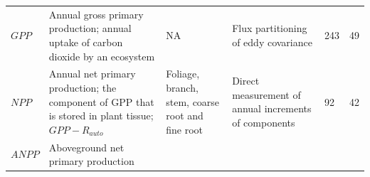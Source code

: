 \documentclass[]{article}
\begin{document}
\begin{longtable}[]{@{}llllll@{}}
\begin{minipage}[t]{0.14\columnwidth}
\(GPP\)\strut
\end{minipage} & \begin{minipage}[t]{0.19\columnwidth}\raggedright\strut
Annual gross primary production; annual uptake of carbon dioxide by an
ecosystem\strut
\end{minipage} & \begin{minipage}[t]{0.13\columnwidth}\raggedright\strut
NA\strut
\end{minipage} & \begin{minipage}[t]{0.23\columnwidth}\raggedright\strut
Flux partitioning of eddy covariance\strut
\end{minipage} & \begin{minipage}[t]{0.07\columnwidth}\raggedright\strut
243\strut
\end{minipage} & \begin{minipage}[t]{0.07\columnwidth}\raggedright\strut
49\strut
\end{minipage}\tabularnewline
\begin{minipage}[t]{0.14\columnwidth}\raggedright\strut
\(NPP\)\strut
\end{minipage} & \begin{minipage}[t]{0.19\columnwidth}\raggedright\strut
Annual net primary production; the component of GPP that is stored in
plant tissue; \(GPP - R_{auto}\)\strut
\end{minipage} & \begin{minipage}[t]{0.13\columnwidth}\raggedright\strut
Foliage, branch, stem, coarse root and fine root\strut
\end{minipage} & \begin{minipage}[t]{0.23\columnwidth}\raggedright\strut
Direct measurement of annual increments of components\strut
\end{minipage} & \begin{minipage}[t]{0.07\columnwidth}\raggedright\strut
92\strut
\end{minipage} & \begin{minipage}[t]{0.07\columnwidth}\raggedright\strut
42\strut
\end{minipage}\tabularnewline
\begin{minipage}[t]{0.14\columnwidth}\raggedright\strut
\(ANPP\)\strut
\end{minipage} & \begin{minipage}[t]{0.19\columnwidth}\raggedright\strut
Aboveground net primary production\strut
\end{minipage} & \begin{minipage}[t]{0.13\columnwidth}\raggedright\strut

\end{minipage}
\end{longtable}
\end{document}
